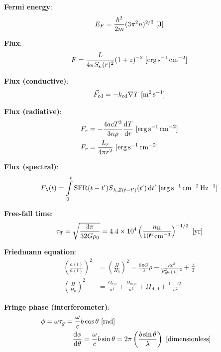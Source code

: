 \documentclass[a4paper,10pt]{article}
\begin{document}
{\noindent}\textbf{Fermi energy}:
\begin{align*}
    E_F = \frac{\hbar^2}{2m} (3\pi^2n)^{2/3} ~ [{\rm J}]
\end{align*}

{\noindent}\textbf{Flux}:
\begin{align*}
    F = \frac{L}{4\pi S_\kappa(r)^2}(1+z)^{-2} ~ [{\rm erg\,s^{-1}\,cm^{-2}}]
\end{align*}

{\noindent}\textbf{Flux (conductive)}:
\begin{align*}
    \vec{F}_{\rm cd} = -k_{\rm cd}\nabla T ~ [{\rm m^2\,s^{-1}}]
\end{align*}

{\noindent}\textbf{Flux (radiative)}:
\begin{align*}
    F_r &= -\frac{4acT^3}{3\kappa\rho}\frac{{\rm d}T}{{\rm d}r} ~ [{\rm erg\,s^{-1}\,cm^{-2}}] \\
    F_r &=  \frac{L_r}{4\pi r^2} ~ [{\rm erg\,s^{-1}\,cm^{-2}}]
\end{align*}

{\noindent}\textbf{Flux (spectral)}:
\begin{align*}
    F_\lambda(t) = \int\limits_0^t \mathrm{SFR}(t-t')S_{\lambda,Z(t-t')}(t')\,\mathrm{d}t' ~ [{\rm erg\,s^{-1}\,cm^{-2}\,Hz^{-1}}]
\end{align*}

{\noindent}\textbf{Free-fall time}:
\begin{align*}
    \tau_{\rm ff} = \sqrt{\frac{3\pi}{32G\rho_0}} = 4.4\times10^4 \left(\frac{n_{\rm H}}{10^6\,{\rm cm^{-3}}}\right)^{-1/2} ~ [{\rm yr}]
\end{align*}

{\noindent}\textbf{Friedmann equation}:
\begin{align*}
    \left(\frac{\dot{a(t)}}{a(t)}\right)^2 &=  \left(\frac{H}{H_0}\right)^2 = \frac{8\pi G}{3}\rho - \frac{\kappa c^2}{R_0^2a(t)^2} + \frac{\Lambda}{3} \\
    \left(\frac{H}{H_0}\right)^2 &= \frac{\Omega_{r,0}}{a^4} + \frac{\Omega_{m,0}}{a^3} + \Omega_{\Lambda,0} + \frac{1-\Omega_0}{a^2}
\end{align*}

{\noindent}\textbf{Fringe phase (interferometer)}:
\begin{align*}
    \phi = \omega\tau_g = \frac{\omega}{c} b\cos\theta ~ [{\rm rad}] \\
    \frac{{\rm d\phi}}{{\rm d}\theta} = \frac{\omega}{c} b\sin\theta &= 2\pi \left(\frac{b\sin\theta}{\lambda}\right) ~ [{\rm dimensionless}]
\end{align*}
\end{document}

